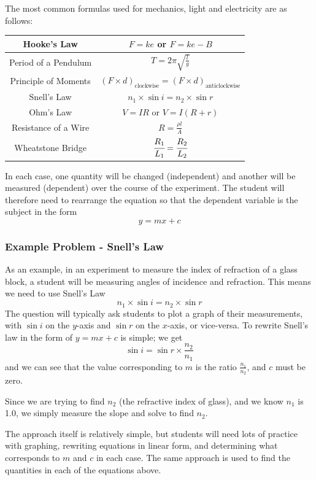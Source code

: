 The most common formulas used for mechanics, light and electricity are as follows:

\begin{center}
\begin{tabular}{ | c | c | }
\hline
Hooke's Law & $ F = ke $ or $ F = ke - B $ \\ \hline
Period of a Pendulum & $T = 2\pi\sqrt{\frac{l}{g}}$ \\ \hline
Principle of Moments & $(F \times d)_{\mathrm{clockwise}} = (F \times d)_{\mathrm{anticlockwise}}$ \\ \hline
Snell's Law & $n_1 \times \sin{i} = n_2 \times \sin{r}$ \\ \hline
Ohm's Law & $V=IR$ or $V = I(R + r)$\\ \hline
Resistance of a Wire & $R = \frac{\rho l}{A}$ \\ \hline
Wheatstone Bridge & $\cfrac{R_1}{L_1} = \cfrac{R_2}{L_2}$ \\ \hline
\end{tabular}
\end{center}

In each case, one quantity will be changed (independent) and another will be
measured (dependent) over the course of the experiment. The student will therefore need
to rearrange the equation so that the dependent variable is the subject in the form
$$y = mx + c$$

\subsubsection{Example Problem - Snell's Law}
As an example, in an experiment to measure the index of refraction of a glass block, a
student will be measuring angles of incidence and refraction. This means we need to use
Snell’s Law $$n_1 \times \sin{i} = n_2 \times \sin{r}$$
The question will typically ask students to plot a graph of their measurements, with $\sin{i}$
on the $y$-axis and $\sin{r}$ on the $x$-axis, or vice-versa. To rewrite Snell’s law in the form of
$y = mx + c$ is simple; we get $$\sin{i} = \sin{r} \times \frac{n_2}{n_1}$$
and we can see that the value corresponding to $m$ is the ratio $\frac{n_1}{n_2}$, and $c$ must be zero.

Since we are trying to find $n_2$ (the refractive index of glass), and we know $n_1$ is 1.0, we
simply measure the slope and solve to find $n_2$.

The approach itself is relatively simple, but students will need lots of practice
with graphing, rewriting equations in linear form, and determining what corresponds to $m$
and $c$ in each case. The same approach is used to find the quantities in each of the
equations above. 

